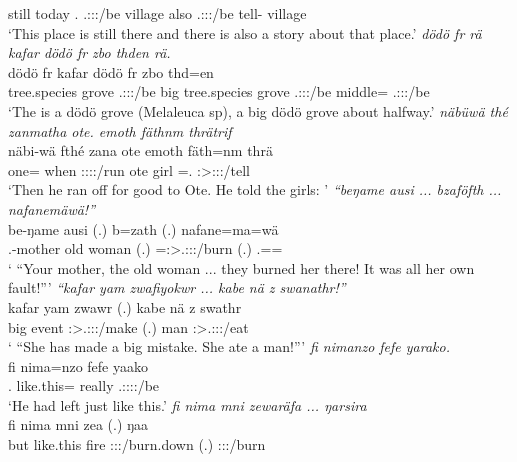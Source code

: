 \begin{exe}
	still today \Med.{\Abl} \Tsg.\F:\Sbj:\Nonpast:\Ipfv/be {\Dem} village also {\Indf} {\Emph} \Tsg.\F:\Sbj:\Nonpast:\Ipfv/be tell-{\Nmlz} village {\Emph}\\
	\trans `This place is still there and there is also a story about that place.'
	\emph{dödö fr rä kafar dödö fr zbo thden rä.}\\
	\gll dödö fr  kafar dödö fr zbo thd=en \\
	{tree.species} grove \Tsg.\F:\Sbj:\Nonpast:\Ipfv/be big {tree.species} grove \Tsg.\F:\Sbj:\Nonpast:\Ipfv/be middle={\Loc} \Tsg.\F:\Sbj:\Nonpast:\Ipfv/be\\
	\trans `The is a dödö grove (Melaleuca sp), a big dödö grove about halfway.'
	\emph{näbüwä thé zanmatha ote. emoth fäthnm thrätrif}\\
	\gll näbi-wä fthé zana ote emoth fäth=nm thrä\\
	one={\Emph} when \Sg:\Sbj:\Pst:\Pfv:\Venit/run ote girl \Dim=\Dat.{\Nsg} \Stsg:\Sbj>\Stpl:\Io:\Irr:\Pfv/tell\\
	\trans `Then he ran off for good to Ote. He told the girls: '
	\emph{``beŋame ausi ... bzaföfth ... nafanemäwä!''}\\
	\gll be-ŋame ausi (.) b=zath (.) nafane=ma=wä\\
	\Snsg.\Poss-mother {old woman} (.) \Med=\Stpl:\Sbj>\Tsg.\F:\Obj:\Pst:\Pfv/burn (.) \Tsg.\Poss=\Char={\Emph}\\
	\trans ` ``Your mother, the old woman ... they burned her there! It was all her own fault!'''
	\emph{``kafar yam zwafiyokwr ... kabe nä z swanathr!''}\\
	\gll kafar yam zwawr (.) kabe nä z swathr\\
	big event \Stsg:\Sbj>\Tsg.\F:\Obj:\Rpst:\Ipfv/make (.) man {\Indf} {\Iam} \Stsg:\Sbj>\Tsg.\Masc:\Obj:\Rpst:\Ipfv/eat\\
	\trans ` ``She has made a big mistake. She ate a man!'''
	\emph{fi nimanzo fefe yarako.}\\
	\gll fi nima=nzo fefe yaako\\
	\Third.{\Abs} {like.this}={\Only} really \Tsg.\Masc:\Sbj:\Pst:\Ipfv:\Andat/be\\
	\trans `He had left just like this.'
	\emph{fi nima mni zewaräfa ... ŋarsira}\\
	\gll fi nima mni zea (.) ŋaa\\
	but {like.this} fire \Sg:\Sbj:\Pst:\Pfv/burn.down (.) \Sg:\Sbj:\Pst:\Ipfv/burn\\

\end{exe}
